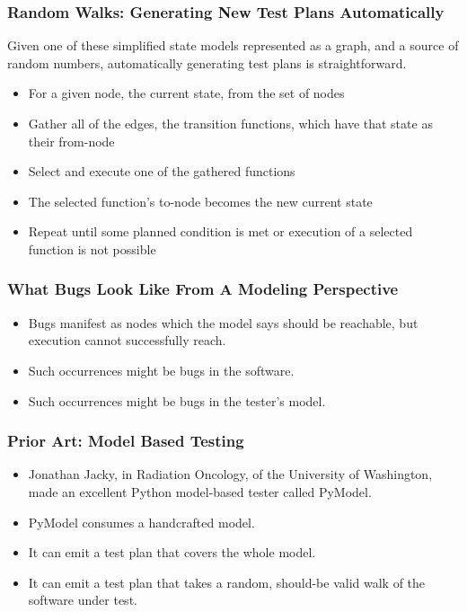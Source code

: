 \begin{frame}
  \frametitle{Random Walks: Generating New Test Plans Automatically}
  Given one of these simplified state models represented as a graph, and a source of random numbers, automatically generating test plans is straightforward.
  \begin{itemize}
    \item For a given node, the current state, from the set of nodes
    \item Gather all of the edges, the transition functions, which have that state as their from-node
    \item Select and execute one of the gathered functions
    \item The selected function's to-node becomes the new current state
    \item Repeat until some planned condition is met or execution of a selected function is not possible
  \end{itemize}
\end{frame}

\begin{frame}
  \frametitle{What Bugs Look Like From A Modeling Perspective}
  \begin{itemize}
    \item Bugs manifest as nodes which the model says should be reachable, but execution cannot successfully reach.
    \item Such occurrences might be bugs in the software.
    \item Such occurrences might be bugs in the tester's model.
  \end{itemize}
\end{frame}

\begin{frame}
  \frametitle{Prior Art: Model Based Testing}
  \begin{itemize}
    \item Jonathan Jacky, in Radiation Oncology, of the University of Washington, made an excellent Python model-based tester called PyModel.
    \item PyModel consumes a handcrafted model.
    \item It can emit a test plan that covers the whole model.
    \item It can emit a test plan that takes a random, should-be valid walk of the software under test.
  \end{itemize}
\end{frame}

